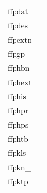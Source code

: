 \documentclass[11pt]{book}
\begin{document}
\begin{tabular}{lr}
ffpdat         & \pageref{ffpdat} \\
ffpdes  & \pageref{ffpdes} \\
ffpextn        & \pageref{ffgextn} \\
ffpgp\_ & \pageref{ffpgpx} \\
ffphbn      & \pageref{ffphbn} \\
ffphext       & \pageref{ffphpr} \\
ffphis      & \pageref{ffphis} \\
ffphpr       & \pageref{ffphpr} \\
ffphps       & \pageref{ffphps} \\
ffphtb      & \pageref{ffphtb} \\
ffpkls  & \pageref{ffpkls} \\
ffpkn\_     & \pageref{ffpknx} \\
ffpktp & \pageref{ffpktp} \\

\end{tabular}
\end{document}
